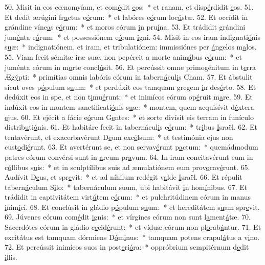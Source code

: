 50. Misit in eos cœnomyíam, et com\uline{é}dit \uline{e}os:~* et ranam, et disp\uline{é}rdidit \uline{e}os.
51. Et dedit ærúgini fr\uline{u}ctus e\uline{ó}rum:~* et labóres e\uline{ó}rum loc\uline{ú}stæ.
52. Et occídit in grándine víne\uline{a}s e\uline{ó}rum:~* et moros eórum \uline{i}n pru\uline{í}na.
53. Et trádidit grándini jum\uline{é}nta e\uline{ó}rum:~* et possessiónem e\uline{ó}rum \uline{i}gni.
54. Misit in eos iram indignati\uline{ó}nis s\uline{u}æ:~* indignatiónem, et iram, et tribulatiónem: immissiónes per \uline{á}ngelos m\uline{a}los.
55. Viam fecit sémitæ iræ suæ, non pepércit a morte anim\uline{á}bus e\uline{ó}rum:~* et juménta eórum in m\uline{o}rte concl\uline{ú}sit.
56. Et percússit omne primogénitum in t\uline{e}rra Æg\uline{ý}pti:~* primítias omnis labóris eórum in tabern\uline{á}cul\uline{i}s Cham.
57. Et ábstulit sicut oves p\uline{ó}pulum s\uline{u}um:~* et perdúxit eos tamquam gregem \uline{i}n des\uline{é}rto.
58. Et dedúxit eos in spe, et non t\uline{i}mu\uline{é}runt:~* et inimícos eórum op\uline{é}ruit m\uline{a}re.
59. Et indúxit eos in montem sanctificati\uline{ó}nis s\uline{u}æ:~* montem, quem acquisívit d\uline{é}xtera \uline{e}jus.
60. Et ejécit a fácie e\uline{ó}rum G\uline{e}ntes:~* et sorte divísit eis terram in funículo distrib\uline{u}ti\uline{ó}nis.
61. Et habitáre fecit in tabernácul\uline{i}s e\uline{ó}rum:~* tr\uline{i}bus \uline{I}sraël.
62. Et tentavérunt, et exacerbavérunt D\uline{e}um exc\uline{é}lsum:~* et testimónia ejus non cust\uline{o}di\uline{é}runt.
63. Et avertérunt se, et non servav\uline{é}runt p\uline{a}ctum:~* quemádmodum patres eórum convérsi sunt in \uline{a}rcum pr\uline{a}vum.
64. In iram concitavérunt eum in c\uline{ó}llibus s\uline{u}is:~* et in sculptílibus suis ad æmulatiónem eum prov\uline{o}cav\uline{é}runt.
65. Audívit D\uline{e}us, et spr\uline{e}vit:~* et ad níhilum redégit v\uline{a}lde \uline{I}sraël.
66. Et répulit tabern\uline{á}culum S\uline{i}lo:~* tabernáculum suum, ubi habitávit \uline{i}n hom\uline{í}nibus.
67. Et trádidit in captivitátem virt\uline{ú}tem e\uline{ó}rum:~* et pulchritúdinem eórum in manus \uline{i}nim\uline{í}ci.
68. Et conclúsit in gládio p\uline{ó}pulum s\uline{u}um:~* et hereditátem s\uline{u}am spr\uline{e}vit.
69. Júvenes eórum com\uline{é}dit \uline{i}gnis:~* et vírgines eórum non sunt l\uline{a}ment\uline{á}tæ.
70. Sacerdótes eórum in gládio c\uline{e}cid\uline{é}runt:~* et víduæ eórum non pl\uline{o}rab\uline{á}ntur.
71. Et excitátus est tamquam dórmiens D\uline{ó}m\uline{i}nus:~* tamquam potens crapul\uline{á}tus a v\uline{i}no.
72. Et percússit inimícos suos in post\uline{e}ri\uline{ó}ra:~* oppróbrium sempitérnum d\uline{e}dit \uline{i}llis.
